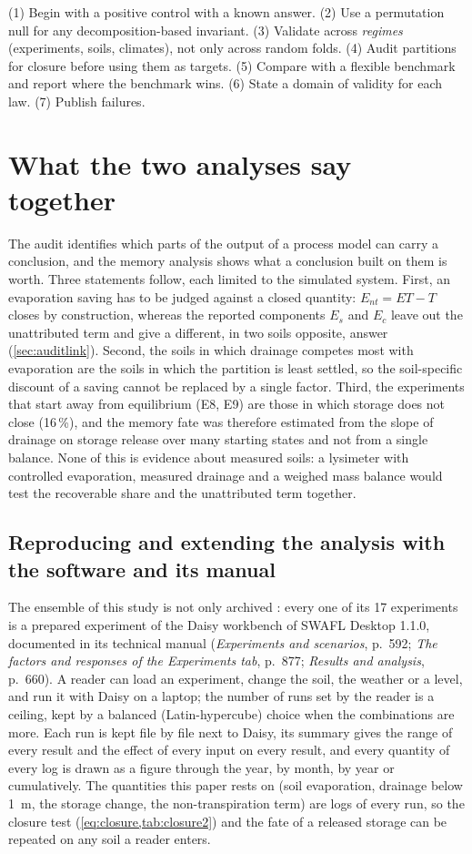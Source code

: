 \documentclass[preprint,12pt,authoryear]{elsarticle}
\begin{document}
(1) Begin with a positive control with a known answer. (2) Use a permutation null for any decomposition-based invariant. (3) Validate across \emph{regimes} (experiments, soils, climates), not only across random folds. (4) Audit partitions for closure before using them as targets. (5) Compare with a flexible benchmark and report where the benchmark wins. (6) State a domain of validity for each law. (7) Publish failures.

\section{What the two analyses say together}
The audit identifies which parts of the output of a process model can carry a conclusion, and the memory analysis shows what a conclusion built on them is worth. Three statements follow, each limited to the simulated system. First, an evaporation saving has to be judged against a closed quantity: $E_{nt}=\mathit{ET}-T$ closes by construction, whereas the reported components $E_s$ and $E_c$ leave out the unattributed term and give a different, in two soils opposite, answer (\cref{sec:auditlink}). Second, the soils in which drainage competes most with evaporation are the soils in which the partition is least settled, so the soil-specific discount of a saving cannot be replaced by a single factor. Third, the experiments that start away from equilibrium (E8, E9) are those in which storage does not close (16\,\%), and the memory fate was therefore estimated from the slope of drainage on storage release over many starting states and not from a single balance. None of this is evidence about measured soils: a lysimeter with controlled evaporation, measured drainage and a weighed mass balance would test the recoverable share and the unattributed term together.

\subsection{Reproducing and extending the analysis with the software and its manual}\label{sec:swafl-repro}
The ensemble of this study is not only archived \citep{HaliluData}: every one of its 17 experiments is a prepared experiment of the Daisy workbench of SWAFL Desktop 1.1.0, documented in its technical manual \citep{HaliluManual} (\emph{Experiments and scenarios}, p.~592; \emph{The factors and responses of the Experiments tab}, p.~877; \emph{Results and analysis}, p.~660). A reader can load an experiment, change the soil, the weather or a level, and run it with Daisy on a laptop; the number of runs set by the reader is a ceiling, kept by a balanced (Latin-hypercube) choice when the combinations are more. Each run is kept file by file next to Daisy, its summary gives the range of every result and the effect of every input on every result, and every quantity of every log is drawn as a figure through the year, by month, by year or cumulatively. The quantities this paper rests on (soil evaporation, drainage below 1~m, the storage change, the non-transpiration term) are logs of every run, so the closure test (\cref{eq:closure,tab:closure2}) and the fate of a released storage can be repeated on any soil a reader enters.
\end{document}
